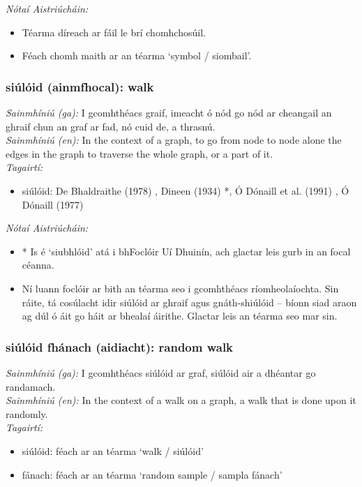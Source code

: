  \noindent \textit{Nótaí Aistriúcháin:}
\begin{itemize}
	\item Téarma díreach ar fáil le brí chomhchosúil.
	\item Féach chomh maith ar an téarma `symbol / siombail'.
\end{itemize}


\subsubsection*{siúlóid (ainmfhocal): walk}
 \noindent \textit{Sainmhíniú (ga):} I gcomhthéacs graif, imeacht ó nód go nód ar cheangail an ghraif chun an graf ar fad, nó cuid de, a thrasnú.
\\
 \noindent \textit{Sainmhíniú (en):} In the context of a graph, to go from node to node alone the edges in the graph to traverse the whole graph, or a part of it.
\\
 \noindent \textit{Tagairtí:}
\begin{itemize}
	\item siúlóid: De Bhaldraithe (1978) \cite{de-bhaldraithe}, Dineen (1934) \cite{dineen}*, Ó Dónaill et al. (1991) \cite{focloir-beag}, Ó Dónaill (1977) \cite{odonaill}
\end{itemize}

 \noindent \textit{Nótaí Aistriúcháin:}
\begin{itemize}
	\item * Is é `siubhlóid' atá i bhFoclóir Uí Dhuinín, ach glactar leis gurb in an focal céanna.
	\item Ní luann foclóir ar bith an téarma seo i gcomhthéacs ríomheolaíochta. Sin ráite, tá cosúlacht idir siúlóid ar ghraif agus gnáth-shiúlóid -- bíonn siad araon ag dúl ó áit go háit ar bhealaí áirithe. Glactar leis an téarma seo mar sin.
\end{itemize}


\subsubsection*{siúlóid fhánach (aidiacht): random walk}
 \noindent \textit{Sainmhíniú (ga):} I gcomhthéacs siúlóid ar graf, siúlóid air a dhéantar go randamach.
\\
 \noindent \textit{Sainmhíniú (en):} In the context of a walk on a graph, a walk that is done upon it randomly.
\\
 \noindent \textit{Tagairtí:}
\begin{itemize}
	\item siúlóid: féach ar an téarma `walk / siúlóid'
	\item fánach: féach ar an téarma `random sample / sampla fánach'
\end{itemize}

